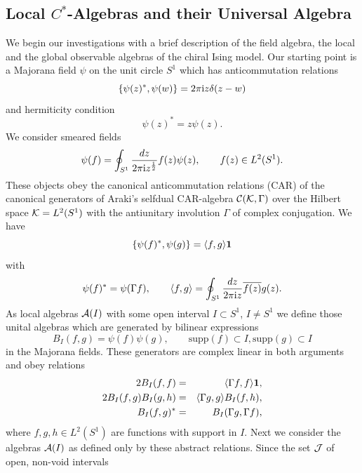 \documentclass[10pt,a4paper]{article}
\begin{document}
\subsection{Local $C^*$-Algebras and their
Universal Algebra}
We begin our investigations with a brief description
of the field algebra, the local and the global
observable algebras of the chiral Ising model.
Our starting point is a Majorana field $\psi$
on the unit circle $S^1$ which has anticommutation
relations
\begin{equation}
\{ \psi(z)^*,\psi(w) \} = 2\pi{\rm i} z \delta(z-w)
\end{equation}
and hermiticity condition
\begin{equation}
\psi(z)^* = z \psi(z).
\end{equation}
We consider smeared fields
\begin{equation}
\psi(f) = \oint_{S^1} \frac{dz}{2\pi{\rm i} z^\frac{1}{2}}
f(z) \psi(z), \qquad f(z) \in L^2(S^1).
\end{equation}
These objects obey the canonical anticommutation relations
(CAR) of the ca\-nonical generators of Araki's \cite{Ara1,Ara2}
selfdual CAR-algebra ${\cal C}({\cal K},\Gamma)$ over the
Hilbert space ${\cal K}=L^2(S^1)$ with the antiunitary
involution $\Gamma$ of complex conjugation. We have
\begin{equation}
\{ \psi(f)^*,\psi(g) \} = \langle f,g \rangle {\bf 1}
\end{equation}
with
\begin{equation}
\psi(f)^* = \psi(\Gamma f), \qquad \langle f,g \rangle =
\oint_{S^1} \frac{dz}{2\pi{\rm i} z} \overline{f(z)} g(z).
\end{equation}
As local algebras ${\cal A}(I)$ with some open interval
$I\subset S^1$, $I\neq S^1$ we define those unital
algebras which are generated by bilinear expressions
\[ B_I(f,g) = \psi(f)\psi(g), \qquad \mbox{supp}(f)
\subset I, \mbox{supp}(g) \subset I \]
in the Majorana fields. These generators are complex
linear in both arguments and obey relations
\begin{eqnarray}
\label{Bbegin}
2 B_I (f,f) &=& \langle \Gamma f,f \rangle {\bf 1},\\
2 B_I (f,g) B_I (g,h) &=& \langle \Gamma g,g \rangle
B_I (f,h), \\
B_I (f,g)^* &=& B_I (\Gamma g,\Gamma f),
\end{eqnarray}
where $f,g,h\in L^2(S^1)$ are functions with support
in $I$. Next we consider the algebras ${\cal A}(I)$
as defined only by these abstract relations.
Since the set ${\cal J}$ of open, non-void intervals
\end{document}
